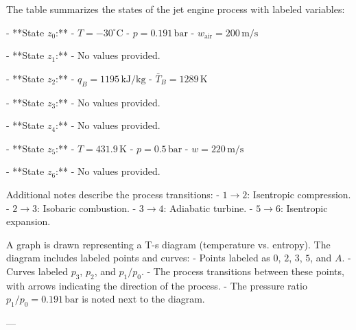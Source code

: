 The table summarizes the states of the jet engine process with labeled variables:  

- **State \( z_0 \):**  
  - \( T = -30^\circ\text{C} \)  
  - \( p = 0.191 \, \text{bar} \)  
  - \( w_{\text{air}} = 200 \, \text{m/s} \)  

- **State \( z_1 \):**  
  - No values provided.  

- **State \( z_2 \):**  
  - \( q_B = 1195 \, \text{kJ/kg} \)  
  - \( \bar{T}_B = 1289 \, \text{K} \)  

- **State \( z_3 \):**  
  - No values provided.  

- **State \( z_4 \):**  
  - No values provided.  

- **State \( z_5 \):**  
  - \( T = 431.9 \, \text{K} \)  
  - \( p = 0.5 \, \text{bar} \)  
  - \( w = 220 \, \text{m/s} \)  

- **State \( z_6 \):**  
  - No values provided.  

Additional notes describe the process transitions:  
- \( 1 \to 2 \): Isentropic compression.  
- \( 2 \to 3 \): Isobaric combustion.  
- \( 3 \to 4 \): Adiabatic turbine.  
- \( 5 \to 6 \): Isentropic expansion.

A graph is drawn representing a T-s diagram (temperature vs. entropy). The diagram includes labeled points and curves:  
- Points labeled as \( 0 \), \( 2 \), \( 3 \), \( 5 \), and \( A \).  
- Curves labeled \( p_3 \), \( p_2 \), and \( p_1/p_0 \).  
- The process transitions between these points, with arrows indicating the direction of the process.  
- The pressure ratio \( p_1/p_0 = 0.191 \, \text{bar} \) is noted next to the diagram.

---